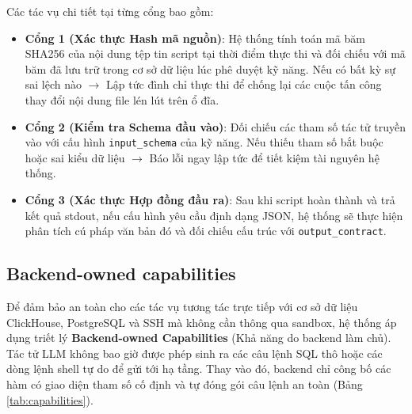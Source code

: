 \documentclass[12pt,a4paper]{article}
\begin{document}
Các tác vụ chi tiết tại từng cổng bao gồm:
\begin{itemize}
    \item \textbf{Cổng 1 (Xác thực Hash mã nguồn)}: Hệ thống tính toán mã băm SHA256 của nội dung tệp tin script tại thời điểm thực thi và đối chiếu với mã băm đã lưu trữ trong cơ sở dữ liệu lúc phê duyệt kỹ năng. Nếu có bất kỳ sự sai lệch nào $\to$ Lập tức đình chỉ thực thi để chống lại các cuộc tấn công thay đổi nội dung file lén lút trên ổ đĩa.
    \item \textbf{Cổng 2 (Kiểm tra Schema đầu vào)}: Đối chiếu các tham số tác tử truyền vào với cấu hình \texttt{input\_schema} của kỹ năng. Nếu thiếu tham số bắt buộc hoặc sai kiểu dữ liệu $\to$ Báo lỗi ngay lập tức để tiết kiệm tài nguyên hệ thống.
    \item \textbf{Cổng 3 (Xác thực Hợp đồng đầu ra)}: Sau khi script hoàn thành và trả kết quả stdout, nếu cấu hình yêu cầu định dạng JSON, hệ thống sẽ thực hiện phân tích cú pháp văn bản đó và đối chiếu cấu trúc với \texttt{output\_contract}.
\end{itemize}

\subsection{Backend-owned capabilities}
Để đảm bảo an toàn cho các tác vụ tương tác trực tiếp với cơ sở dữ liệu ClickHouse, PostgreSQL và SSH mà không cần thông qua sandbox, hệ thống áp dụng triết lý \textbf{Backend-owned Capabilities} (Khả năng do backend làm chủ). Tác tử LLM không bao giờ được phép sinh ra các câu lệnh SQL thô hoặc các dòng lệnh shell tự do để gửi tới hạ tầng. Thay vào đó, backend chỉ công bố các hàm có giao diện tham số cố định và tự đóng gói câu lệnh an toàn (Bảng \ref{tab:capabilities}).
\end{document}
